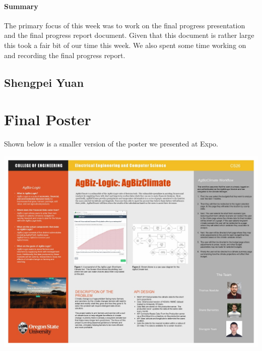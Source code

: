 \documentclass[onecolumn, draftclsnofoot,10pt, compsoc]{article}
\begin{document}
		    \paragraph{Summary} \hfill \break
		        The primary focus of this week was to work on the final progress presentation and the final progress report document. Given that this document is rather large this took a fair bit of our time this week. We also spent some time working on and recording the final progress report.\\
    
    \subsection{Shengpei Yuan}
    
    
\newpage
\section{Final Poster}
    Shown below is a smaller version of the poster we presented at Expo.\\
    \begin{landscape}
        \includegraphics[width=22cm]{./Images/ExpoPosterGroup26.jpg}
    \end{landscape}
%
\end{document}
